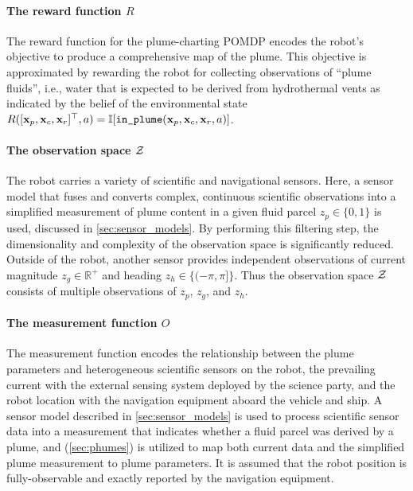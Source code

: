 \paragraph{The reward function $R$} The reward function for the plume-charting POMDP encodes the robot's objective to produce a comprehensive map of the plume. This objective is approximated by rewarding the robot for collecting observations of ``plume fluids'', i.e., water that is expected to be derived from hydrothermal vents as indicated by the belief of the environmental state $R([\x_p, \x_c, \x_r]^\top, a) = \indic{\texttt{in\_plume}(\x_p, \x_c, \x_r, a)}$. 

\paragraph{The observation space $\mathcal{Z}$} The robot carries a variety of scientific and navigational sensors. Here, a sensor model that fuses and converts complex, continuous scientific observations into a simplified measurement of plume content in a given fluid parcel $z_p \in \{0, 1\}$ is used, discussed in \cref{sec:sensor_models}. By performing this filtering step, the dimensionality and complexity of the observation space is significantly reduced. Outside of the robot, another sensor provides independent observations of current magnitude $z_g \in \mathbb{R}^+$ and heading $z_h \in \{(-\pi, \pi]\}$. Thus the observation space $\mathcal{Z}$ consists of multiple observations of $z_p$, $z_g$, and $z_h$.

\paragraph{The measurement function $O$} The measurement function encodes the relationship between the plume parameters and heterogeneous scientific sensors on the robot, the prevailing current with the external sensing system deployed by the science party, and the robot location with the navigation equipment aboard the vehicle and ship. A sensor model described in \cref{sec:sensor_models} is used to process scientific sensor data into a measurement that indicates whether a fluid parcel was derived by a plume, and \PHUMES (\cref{sec:phumes}) is utilized to map both current data and the simplified plume measurement to plume parameters. It is assumed that the robot position is fully-observable and exactly reported by the navigation equipment. 

